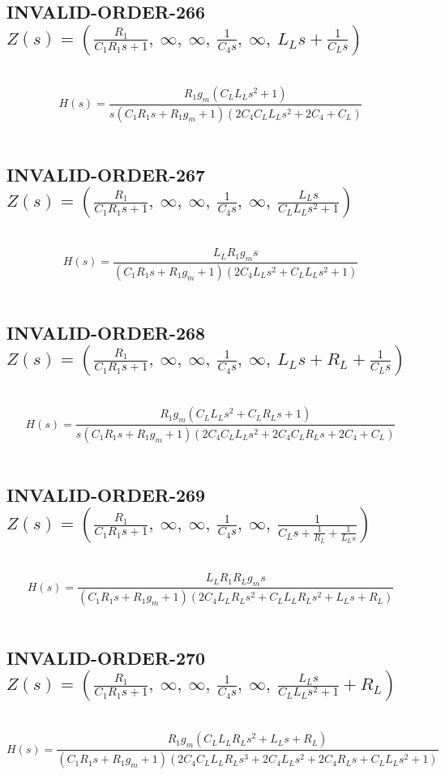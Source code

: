 \documentclass{article}
\begin{document}
\subsection{INVALID-ORDER-266 $Z(s) = \left( \frac{R_{1}}{C_{1} R_{1} s + 1}, \  \infty, \  \infty, \  \frac{1}{C_{4} s}, \  \infty, \  L_{L} s + \frac{1}{C_{L} s}\right)$ } \ 
\textbf{\[H(s) = \frac{R_{1} g_{m} \left(C_{L} L_{L} s^{2} + 1\right)}{s \left(C_{1} R_{1} s + R_{1} g_{m} + 1\right) \left(2 C_{4} C_{L} L_{L} s^{2} + 2 C_{4} + C_{L}\right)}\] } \ 
\subsection{INVALID-ORDER-267 $Z(s) = \left( \frac{R_{1}}{C_{1} R_{1} s + 1}, \  \infty, \  \infty, \  \frac{1}{C_{4} s}, \  \infty, \  \frac{L_{L} s}{C_{L} L_{L} s^{2} + 1}\right)$ } \ 
\textbf{\[H(s) = \frac{L_{L} R_{1} g_{m} s}{\left(C_{1} R_{1} s + R_{1} g_{m} + 1\right) \left(2 C_{4} L_{L} s^{2} + C_{L} L_{L} s^{2} + 1\right)}\] } \ 
\subsection{INVALID-ORDER-268 $Z(s) = \left( \frac{R_{1}}{C_{1} R_{1} s + 1}, \  \infty, \  \infty, \  \frac{1}{C_{4} s}, \  \infty, \  L_{L} s + R_{L} + \frac{1}{C_{L} s}\right)$ } \ 
\textbf{\[H(s) = \frac{R_{1} g_{m} \left(C_{L} L_{L} s^{2} + C_{L} R_{L} s + 1\right)}{s \left(C_{1} R_{1} s + R_{1} g_{m} + 1\right) \left(2 C_{4} C_{L} L_{L} s^{2} + 2 C_{4} C_{L} R_{L} s + 2 C_{4} + C_{L}\right)}\] } \ 
\subsection{INVALID-ORDER-269 $Z(s) = \left( \frac{R_{1}}{C_{1} R_{1} s + 1}, \  \infty, \  \infty, \  \frac{1}{C_{4} s}, \  \infty, \  \frac{1}{C_{L} s + \frac{1}{R_{L}} + \frac{1}{L_{L} s}}\right)$ } \ 
\textbf{\[H(s) = \frac{L_{L} R_{1} R_{L} g_{m} s}{\left(C_{1} R_{1} s + R_{1} g_{m} + 1\right) \left(2 C_{4} L_{L} R_{L} s^{2} + C_{L} L_{L} R_{L} s^{2} + L_{L} s + R_{L}\right)}\] } \ 
\subsection{INVALID-ORDER-270 $Z(s) = \left( \frac{R_{1}}{C_{1} R_{1} s + 1}, \  \infty, \  \infty, \  \frac{1}{C_{4} s}, \  \infty, \  \frac{L_{L} s}{C_{L} L_{L} s^{2} + 1} + R_{L}\right)$ } \ 
\textbf{\[H(s) = \frac{R_{1} g_{m} \left(C_{L} L_{L} R_{L} s^{2} + L_{L} s + R_{L}\right)}{\left(C_{1} R_{1} s + R_{1} g_{m} + 1\right) \left(2 C_{4} C_{L} L_{L} R_{L} s^{3} + 2 C_{4} L_{L} s^{2} + 2 C_{4} R_{L} s + C_{L} L_{L} s^{2} + 1\right)}\] } \ 
\end{document}
